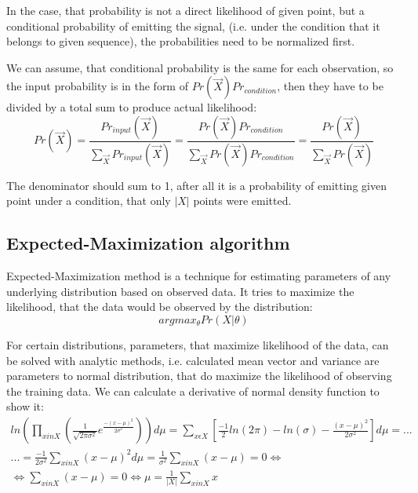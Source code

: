 \documentclass[12pt,a4paper,english]{article}
\begin{document}
In the case, that probability is not a direct likelihood of given point, but a conditional probability of emitting the signal,
(i.e. under the condition that it belongs to given sequence), the probabilities need to be normalized first. \newline

We can assume, that conditional probability is the same for each observation,
 so the input probability is in the form of $ Pr(\vec X) Pr_{condition}$,
then they have to be divided by a total sum to produce actual likelihood:
\begin{equation}
    Pr(\vec X) = \frac{Pr_{input}(\vec X)}{\sum_{\vec X} Pr_{input}(\vec X)} = \frac{Pr(\vec X) Pr_{condition}}{\sum_{\vec X} Pr(\vec X) Pr_{condition}} = 
\frac{Pr(\vec X)}{\sum_{\vec X} Pr(\vec X)}
\end{equation}

The denominator should sum to 1, after all it is a probability of emitting given point under a condition, that only $|X|$ points were emitted.

\newpage
\subsection{Expected-Maximization algorithm}

Expected-Maximization method is a technique for estimating parameters of any underlying distribution based on observed data. It tries to maximize the likelihood, that the data would be observed by the distribution: 
\begin{equation}
    argmax_{\theta} Pr(X | \theta)
\end{equation}

For certain distributions, parameters, that maximize likelihood of the data, can be solved with analytic methods, i.e. calculated mean vector and variance are parameters to normal distribution, that do maximize the likelihood of observing the training data. \newline
We can calculate a derivative of normal density function to show it:
\begin{multline}
    ln(\prod_{x in X} (\frac 1 {\sqrt{2\pi\sigma^2}} e^{\frac{-(x-\mu)^2}{2\sigma^2}}))d\mu  = \sum_{x \epsilon X}[\frac{-1} 2 ln(2\pi)-ln(\sigma)- \frac{(x-\mu)^2} {2 \sigma^2} ]d\mu = ... \\
    ...= \frac {-1} {2 \sigma^2} \sum_{x in X}{(x-\mu)^2}d\mu = \frac 1 {\sigma^2} \sum_{x in X}{(x-\mu)}=0 \iff \\
    \iff \sum_{x in X}{(x-\mu)}=0 \iff \mu = \frac 1 {|X|} \sum_{x in X}x
\end{multline}
\end{document}
